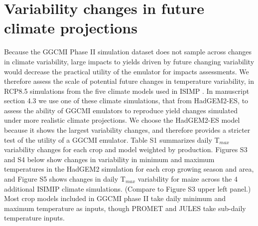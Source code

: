 \documentclass[12pt]{article}
\begin{document}
\section{Variability changes in future climate projections}
\begin{justify}
Because the GGCMI Phase II simulation dataset does not sample across changes in climate variability, large impacts to yields driven by future changing variability would decrease the practical utility of the emulator for impacts assessments.
	We therefore assess the scale of potential future changes in temperature variability, in RCP8.5 simulations from the five climate models used in ISIMP \parencite[the Inter-Sectoral Impact Model Intercomparison Project;][]{Warszawski3228, Frieler2017}.
 In manuscript section 4.3 we use one of these climate simulations, that from HadGEM2-ES, to assess the ability of GGCMI emulators to reproduce yield changes simulated under more realistic climate projections. We choose the HadGEM2-ES model because it shows the largest variability changes, and therefore provides a stricter test of the utility of a GGCMI emulator.
 Table S1 summarizes daily T$_{max}$ variability changes for each crop and model weighted by production. 
	Figures S3 and S4 below show changes in variability in minimum and maximum temperatures in the HadGEM2 simulation for each crop growing season and area, and Figure S5 shows changes in daily T$_{max}$ variability for maize across the 4 additional ISIMIP climate simulations. (Compare to Figure S3 upper left panel.)
	Most crop models included in GGCMI phase II take daily minimum and maximum temperature as inputs, though PROMET and JULES take sub-daily temperature inputs.
	  

\end{justify}
\end{document}

